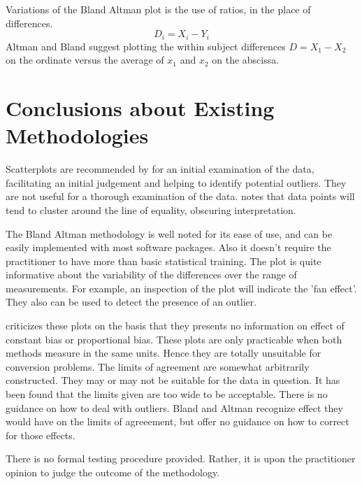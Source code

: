 \documentclass[Main.tex]{subfiles}
\begin{document}
	Variations of the Bland Altman plot is the use of ratios, in the
	place of differences.
	\begin{equation}
	D_{i} = X_{i} - Y_{i}   \label{BA01}
	\end{equation}
	Altman and Bland suggest plotting the within subject differences $
	D = X_{1} - X_{2} $ on the ordinate versus the average of $x_{1}$
	and  $x_{2}$ on the abscissa.
	

	
\section{Conclusions about Existing Methodologies}

Scatterplots are recommended by \citet{BA83} for an initial
examination of the data, facilitating an initial judgement and helping to identify potential outliers. They are not useful for a thorough examination of the data. \citet{BritHypSoc} notes that data points will tend to cluster around the line of equality, obscuring interpretation.


The Bland Altman methodology is well noted for its ease of use, and can be easily implemented with most software packages. Also it
doesn't require the practitioner to have more than basic statistical training. The plot is quite informative about the variability of the differences over the range of measurements. For example, an inspection of the plot will indicate the 'fan effect'. They also can be used to detect the presence of an outlier.

\citet{ludbrook97,ludbrook02} criticizes these plots on the
basis that they presents no information on effect of constant bias
or proportional bias. These plots are only practicable when both methods measure in the same units. Hence they are totally
unsuitable for conversion problems. The limits of agreement are somewhat arbitrarily constructed. They may or may not be suitable
for the data in question. It has been found that the limits given are too wide to be acceptable. There is no guidance on how to deal
with outliers. Bland and Altman recognize effect they would have on the limits of agreeement, but offer no guidance on how to correct for those effects.

There is no formal testing procedure provided. Rather, it is upon
the practitioner opinion to judge the outcome of the methodology.





\end{document}
